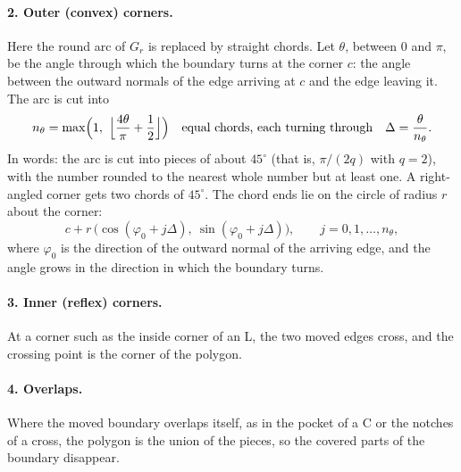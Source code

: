 \documentclass[10pt]{article}
\begin{document}
\paragraph{2. Outer (convex) corners.} Here the round arc of $G_r$ is replaced by straight chords. Let $\theta$, between
$0$ and $\pi$, be the angle through which the boundary turns at the corner $c$: the angle between the outward normals of
the edge arriving at $c$ and the edge leaving it. The arc is cut into
\begin{equation}
  n_\theta = \max\Bigl(1,\ \Bigl\lfloor \frac{4\theta}{\pi} + \frac{1}{2} \Bigr\rfloor\Bigr)
  \quad\text{equal chords, each turning through}\quad \Delta = \frac{\theta}{n_\theta}.
  \label{eq:nchords}
\end{equation}
In words: the arc is cut into pieces of about $45^\circ$ (that is, $\pi/(2q)$ with $q = 2$), with the number rounded to the
nearest whole number but at least one. A right-angled corner gets two chords of $45^\circ$. The chord ends lie on the
circle of radius $r$ about the corner:
\begin{equation}
  c + r\,\bigl(\cos(\varphi_0 + j\Delta),\ \sin(\varphi_0 + j\Delta)\bigr), \qquad j = 0, 1, \ldots, n_\theta,
  \label{eq:fillet}
\end{equation}
where $\varphi_0$ is the direction of the outward normal of the arriving edge, and the angle grows in the direction in which
the boundary turns.

\paragraph{3. Inner (reflex) corners.} At a corner such as the inside corner of an L, the two moved edges cross, and
the crossing point is the corner of the polygon.

\paragraph{4. Overlaps.} Where the moved boundary overlaps itself, as in the pocket of a C or the notches of a cross, the
polygon is the union of the pieces, so the covered parts of the boundary disappear.
\end{document}
